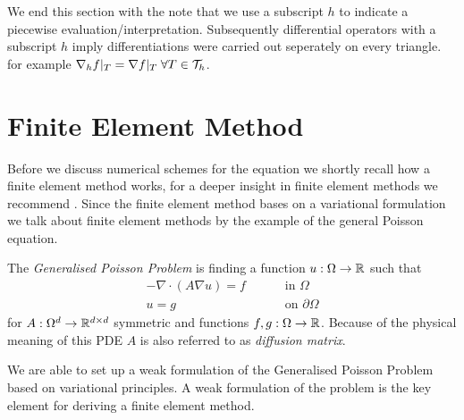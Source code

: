 \begin{definition} 
We end this section with the note that we use a subscript $h$ to indicate a piecewise evaluation/interpretation.  Subsequently differential operators with a subscript $h$ imply differentiations were carried out seperately on every triangle. for example $\nabla_h f |_T = \nabla f |_T \; \forall T \in \mathcal{T}_h$. 



\section{Finite Element Method}
Before we discuss numerical schemes for the \MA equation we shortly recall how a finite element method works, for a deeper insight in finite element methods we recommend \cite{Braess2003, BS2002}. Since the finite element method bases on a variational formulation we talk about finite element methods by the example of the general Poisson equation. 


\begin{definition} \label{def: General Poisson Problem}
The \emph{Generalised Poisson Problem} is finding a function $u:\Omega \rightarrow \mathbb{R}$ such that 
\begin{align}
	-\nabla \cdot (A \nabla u) = f \qquad &\text{ in }\Omega \label{eq: poisson eq} \\
	u = g \qquad &\text{ on } \partial \Omega    \label{eq: poisson bc}
\end{align}
for $ A:\Omega^d \rightarrow \mathbb{R}^{d \times d}$ symmetric and functions $f,g:\Omega \rightarrow \mathbb{R} $. 
Because of the physical meaning of this PDE $A$ is also referred to as \emph{diffusion matrix}.
\end{definition}

We are able to set up a weak formulation of the Generalised Poisson Problem based on variational principles. A weak formulation of the problem is the key element for deriving a finite element method.


\end{definition}
